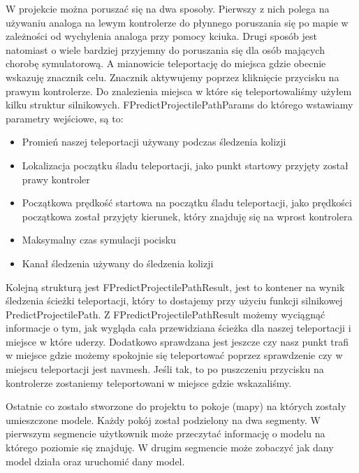 \documentclass[a4paper,12pt,reqno]{article}
\begin{document}
W projekcie można poruszać się na dwa sposoby. Pierwszy z nich polega na używaniu 
analoga na lewym kontrolerze do płynnego poruszania się po mapie w zależności od wychylenia analoga przy pomocy kciuka. Drugi sposób jest natomiast o wiele bardziej przyjemny do poruszania się dla osób mających chorobę symulatorową. A mianowicie teleportację do miejsca gdzie obecnie wskazuję znacznik celu. Znacznik aktywujemy poprzez kliknięcie przycisku na prawym kontrolerze. Do znalezienia miejsca w które się teleportowaliśmy użyłem kilku struktur silnikowych. FPredictProjectilePathParams do którego wstawiamy parametry wejściowe, są to:

\begin{itemize}
\item Promień naszej teleportacji używany podczas śledzenia kolizji
\item Lokalizacja początku śladu teleportacji, jako punkt startowy przyjęty został prawy kontroler
\item Początkowa prędkość startowa na początku śladu teleportacji, jako prędkości początkowa został przyjęty kierunek, który znajduję się na wprost kontrolera
\item Maksymalny czas symulacji pocisku
\item Kanał śledzenia używany do śledzenia kolizji
\end{itemize}

Kolejną strukturą jest FPredictProjectilePathResult, jest to kontener na wynik śledzenia ścieżki teleportacji, który to dostajemy przy użyciu funkcji silnikowej PredictProjectilePath. Z FPredictProjectilePathResult możemy wyciągnąć informacje o
tym, jak wygląda cała przewidziana ścieżka dla naszej teleportacji i miejsce w które uderzy. Dodatkowo sprawdzana jest jeszcze czy nasz punkt trafi w miejsce gdzie możemy spokojnie się teleportować poprzez sprawdzenie czy w miejscu teleportacji jest navmesh. Jeśli tak, to po puszczeniu przycisku na kontrolerze zostaniemy teleportowani w miejsce gdzie wskazaliśmy.



Ostatnie co zostało stworzone do projektu to pokoje (mapy) na których zostały umieszczone modele. Każdy pokój został podzielony na dwa segmenty. W pierwszym segmencie użytkownik może przeczytać informację o modelu na którego poziomie się znajduję. W drugim segmencie może zobaczyć jak dany model działa oraz uruchomić dany model.
\end{document}

